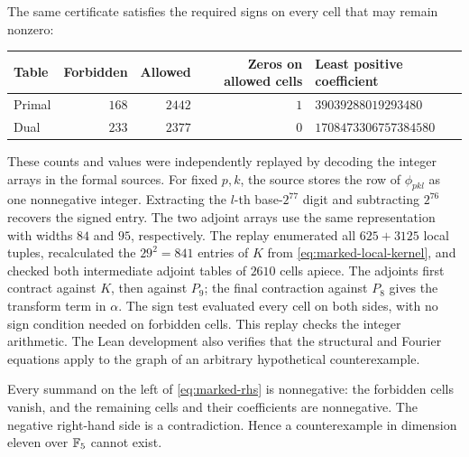 The same certificate satisfies the required signs on every cell that may remain nonzero:
\begin{center}
\begin{tabular}{lrrrl}
\toprule
Table & Forbidden & Allowed & Zeros on allowed cells & Least positive coefficient \\
\midrule
Primal & \(168\) & \(2442\) & \(1\) & \(39039288019293480\)\\
Dual & \(233\) & \(2377\) & \(0\) & \(1708473306757384580\)\\
\bottomrule
\end{tabular}
\end{center}
These counts and values were independently replayed by decoding the integer arrays in the formal sources. For fixed \(p,k\), the source stores the row of \(\phi_{pkl}\) as one nonnegative integer. Extracting the \(l\)-th base-\(2^{77}\) digit and subtracting \(2^{76}\) recovers the signed entry. The two adjoint arrays use the same representation with widths \(84\) and \(95\), respectively. The replay enumerated all \(625+3125\) local tuples, recalculated the \(29^2=841\) entries of \(K\) from \eqref{eq:marked-local-kernel}, and checked both intermediate adjoint tables of \(2610\) cells apiece. The adjoints first contract against \(K\), then against \(P_9\); the final contraction against \(P_8\) gives the transform term in \(\alpha\). The sign test evaluated every cell on both sides, with no sign condition needed on forbidden cells. This replay checks the integer arithmetic. The Lean development also verifies that the structural and Fourier equations apply to the graph of an arbitrary hypothetical counterexample.

Every summand on the left of \eqref{eq:marked-rhs} is nonnegative: the forbidden cells vanish, and the remaining cells and their coefficients are nonnegative. The negative right-hand side is a contradiction. Hence a counterexample in dimension eleven over \(\mathbb F_5\) cannot exist.
